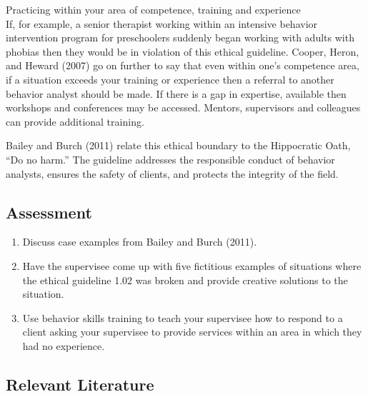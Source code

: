 Practicing within your area of competence, training and experience\\
If, for example, a senior therapist working within an intensive behavior intervention program for preschoolers suddenly began working with adults with phobias then they would be in violation of this ethical guideline. Cooper, Heron, and Heward (2007) go on further to say that even within one's competence area, if a situation exceeds your training or experience then a referral to another behavior analyst should be made. If there is a gap in expertise, available then workshops and conferences may be accessed.  Mentors, supervisors and colleagues can provide additional training.  

Bailey and Burch (2011) relate this ethical boundary to the Hippocratic Oath, ``Do no harm.''  The guideline addresses the responsible conduct of behavior analysts, ensures the safety of clients, and protects the integrity of the field.
%
\subsection{Assessment}
\begin{enumerate}
\item Discuss case examples from Bailey and Burch (2011).
\item Have the supervisee come up with five fictitious examples of situations where the ethical guideline 1.02 was broken and provide creative solutions to the situation.
\item Use behavior skills training to teach your supervisee how to respond to a client asking your supervisee to provide services within an area in which they had no experience.
%
\end{enumerate}
%
\subsection{Relevant Literature}
\begin{refsection}
\nocite{test,alang2017police,clayton2018black}
\printbibliography[heading=none]
\end{refsection} 
%
